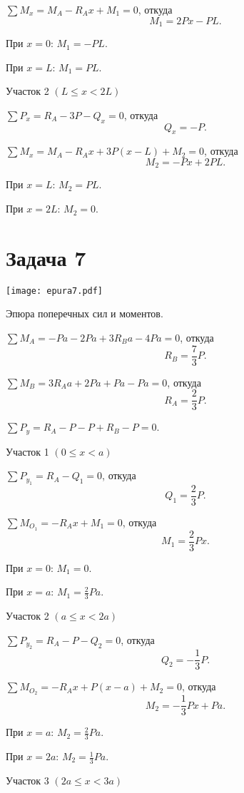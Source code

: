 $\sum M_x = M_A - R_A x + M_1 = 0$,
откуда
\[
    M_1 = 2Px - PL.
\]

При $x = 0$: $M_1 = -PL$.

При $x = L$: $M_1 = PL$.

Участок 2 $ \left(L \le x < 2L\right)$

$\sum P_x = R_A - 3P - Q_x = 0$,
откуда
\[
    Q_x = -P.
\]

$ \sum M_x = M_A - R_A x + 3P (x-L) + M_2 = 0 $,
откуда
\[
    M_2 = -Px + 2PL.
\]

При $x = L$: $M_2 = PL$.

При $x = 2L$: $M_2 = 0$.

\newpage


\section{Задача 7}

\begin{floatingfigure}[r]{0.5\textwidth}
    \centering
    \texttt{[image: epura7.pdf]}
    \caption{Эпюра поперечных сил и моментов.}
    \label{fig:chap1-epura7}
\end{floatingfigure}

$\sum M_A = -Pa - 2 P a + 3 R_B a - 4 P a = 0$,
откуда
\[
    R_B = \frac{7}{3}P.
\]

$\sum M_B = 3 R_A a + 2 P a + Pa - Pa = 0$,
откуда
\[
    R_A = \frac{2}{3}P.
\]

$\sum P_y = R_A - P - P + R_B - P = 0$.

Участок 1 $\left(0 \le x < a\right)$

$\sum P_{y_1} = R_A - Q_1 = 0$,
откуда
\[
    Q_1 = \frac{2}{3}P.
\]

$\sum M_{O_1} = -R_A x + M_1 = 0$,
откуда
\[
    M_1 = \frac{2}{3} Px.
\]

При $x = 0$: $M_1 = 0$.

При $x = a$: $M_1 = \frac{2}{3} Pa$.

Участок 2 $\left(a \le x < 2a\right)$

$\sum P_{y_2} = R_A - P - Q_2 = 0$,
откуда
\[
    Q_2 = -\frac{1}{3}P.
\]

$\sum M_{O_2} = -R_A x + P (x - a) + M_2 = 0$,
откуда
\[
    M_2 = -\frac{1}{3}Px + Pa.
\]

При $x = a$: $M_2 = \frac{2}{3} Pa$.

При $x = 2 a$: $M_2 = \frac{1}{3} Pa$.

Участок 3 $\left(2a \le x < 3a\right)$

